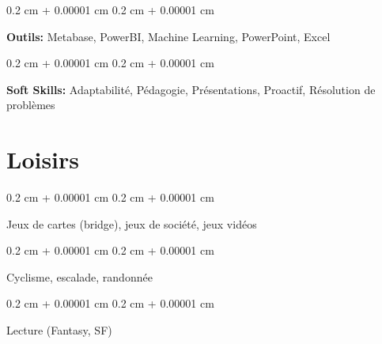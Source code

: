 \documentclass[10pt, letterpaper]{article}
\newenvironment{onecolentry}{
    \begin{adjustwidth}{
        0.2 cm + 0.00001 cm
    }{
        0.2 cm + 0.00001 cm
    }
}{
    \end{adjustwidth}
} %
\begin{document}
        \vspace{0.2 cm}

        \begin{onecolentry}
            \textbf{Outils:} Metabase, PowerBI, Machine Learning, PowerPoint, Excel
        \end{onecolentry}

        \vspace{0.2 cm}

        \begin{onecolentry}
            \textbf{Soft Skills:} Adaptabilité, Pédagogie, Présentations, Proactif, Résolution de problèmes
        \end{onecolentry}


    
    \section{Loisirs}



        
        \begin{onecolentry}
            Jeux de cartes (bridge), jeux de société, jeux vidéos
        \end{onecolentry}

        \vspace{0.2 cm}

        \begin{onecolentry}
            Cyclisme, escalade, randonnée
        \end{onecolentry}

        \vspace{0.2 cm}

        \begin{onecolentry}
            Lecture (Fantasy, SF)
        \end{onecolentry}


    
\end{document}

